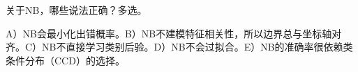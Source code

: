 关于NB，哪些说法正确？多选。


A）NB会最小化出错概率。B）NB不建模特征相关性，所以边界总与坐标轴对齐。C）NB不直接学习类别后验。D）NB不会过拟合。E）NB的准确率很依赖类条件分布（CCD）的选择。

